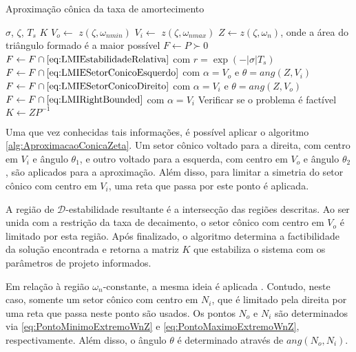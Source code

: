 \begin{algorithm}[ht!]
  \caption{Aproximação cônica da taxa de amortecimento}\label{alg:AproximacaoConicaZeta}
  \begin{algorithmic}[1]
    \Require $\sigma$, $\zeta$, $T_s$
    \Ensure $K$
    \State $V_o \gets $ $z(\zeta,\omega_{nmin})$
    \State $V_i \gets $ $z\left(\zeta,\omega_{nmax}\right)$
    \State $Z \gets z(\zeta,\omega_n)$, onde a área do triângulo formado é a maior possível
    \State $F \gets P \succ 0$
    \State $F \gets F \cap \eqref{eq:LMIEstabilidadeRelativa}$ com $r = \exp{\left(-|\sigma|T_s\right)}$ 
    \State $F \gets F \cap \eqref{eq:LMIESetorConicoEsquerdo}$ com $\alpha = V_o$ e $\theta = ang(Z,V_i)$ 
    \State $F \gets F \cap \eqref{eq:LMIESetorConicoDireito}$ com $\alpha = V_i$ e $\theta = ang(Z,V_o)$ 
    \State $F \gets F \cap \eqref{eq:LMIRightBounded}$ com $\alpha = V_i$  
    \State Verificar se o problema é factível
    \State $K \gets ZP^{-1}$
  \end{algorithmic}
\end{algorithm}

Uma que vez conhecidas tais informações, é possível aplicar o algoritmo \ref{alg:AproximacaoConicaZeta}. Um setor cônico voltado para a direita, com centro em $V_i$ e ângulo $\theta_1$, e outro voltado para a esquerda, com centro em $V_o$ e ângulo $\theta_2$, são aplicados para a aproximação. Além disso, para limitar a simetria do setor cônico com centro em $V_i$, uma reta que passa por este ponto é aplicada.

A região de $\mathscr{D}$-estabilidade resultante é a intersecção das regiões descritas. Ao ser unida com a restrição da taxa de decaimento, o setor cônico com centro em $V_o$ é limitado por esta região. Após finalizado, o algoritmo determina a factibilidade da solução encontrada e retorna a matriz $K$ que estabiliza o sistema com os parâmetros de projeto informados.

Em relação à região $\omega_n$-constante, a mesma ideia é aplicada \cite{CHIQUETO2021}. Contudo, neste caso, somente um setor cônico com centro em $N_i$, que é limitado pela direita por uma reta que passa neste ponto são usados. Os pontos $N_o$ e $N_i$ são determinados via \eqref{eq:PontoMinimoExtremoWnZ} e \eqref{eq:PontoMaximoExtremoWnZ}, respectivamente. Além disso, o ângulo $\theta$ é determinado através de $ang(N_o,N_i)$.  

